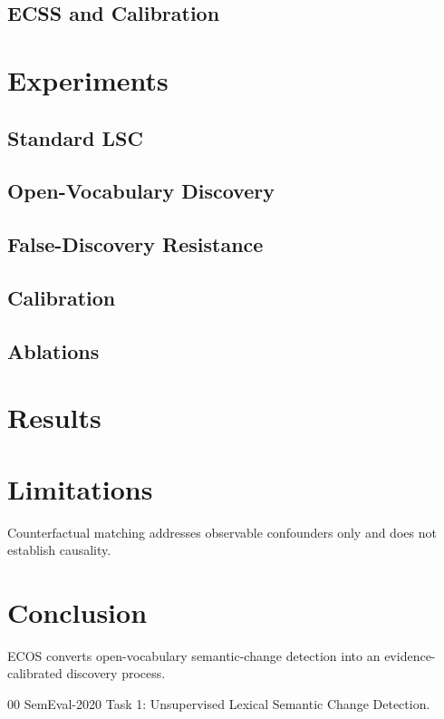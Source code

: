 \documentclass[conference]{IEEEtran}
\begin{document}
\subsection{ECSS and Calibration}

\section{Experiments}
\subsection{Standard LSC}
\subsection{Open-Vocabulary Discovery}
\subsection{False-Discovery Resistance}
\subsection{Calibration}
\subsection{Ablations}

\section{Results}

\section{Limitations}
Counterfactual matching addresses observable confounders only and does not establish causality.

\section{Conclusion}
ECOS converts open-vocabulary semantic-change detection into an evidence-calibrated discovery process.


\begin{thebibliography}{00}
 SemEval-2020 Task 1: Unsupervised Lexical Semantic Change Detection.
\end{thebibliography}
\end{document}

